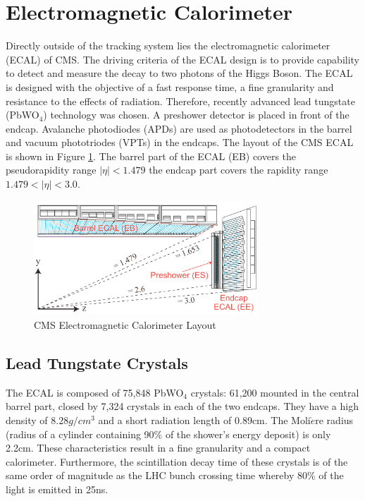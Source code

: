  \section{Electromagnetic Calorimeter}
Directly outside of the tracking system lies the electromagnetic calorimeter 
(ECAL) of CMS. The driving criteria of the ECAL design is to provide capability
to detect and measure the decay to two photons of the Higgs Boson. The 
ECAL is designed with the objective of a
fast response time, a fine granularity and resistance to the effects of radiation.
Therefore, recently advanced lead tungstate (PbWO$_{4}$) technology was chosen. 
A preshower detector is placed in front of the endcap. Avalanche photodiodes (APDs)
are used as photodetectors in the barrel and vacuum phototriodes (VPTs) in the
endcaps.
The layout of the CMS ECAL is shown in Figure \ref{fig:ECALLayout}.
The barrel part of the ECAL (EB) covers the pseudorapidity range $|\eta|<1.479$
the endcap part covers the rapidity range $1.479<|\eta|<3.0$.
\begin{figure}[hb]
  \centering
	\includegraphics[width=0.75\textwidth]{images/ECALPreshower.png}
  	\caption[ECAL Layout]
   	{CMS Electromagnetic Calorimeter Layout}
	\label{fig:ECALLayout}
\end{figure}
\subsection{Lead Tungstate Crystals}
The ECAL is composed of 75,848 PbWO$_{4}$ crystals: 61,200 mounted in the 
central barrel part, closed by 7,324 crystals in each of the two endcaps. They 
have a high density of 8.28$g/cm^{3}$ and a short radiation length of 0.89cm. 
The Moli$\grave{e}$re radius (radius of a cylinder containing 90\% of the shower's energy deposit) 
is only 2.2cm. These characteristics result in a fine granularity and a compact
calorimeter. Furthermore, the scintillation decay time of these crystals is of the
same order of magnitude as the LHC bunch crossing time whereby 80\% of 
the light is emitted in 25ns. 
